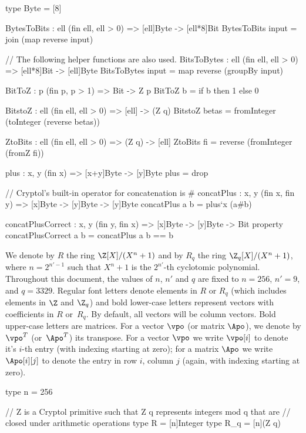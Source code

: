 \begin{code}
  type Byte = [8]
  
  BytesToBits : {ell} (fin ell, ell > 0) => [ell]Byte -> [ell*8]Bit
  BytesToBits input = join (map reverse input)

  // The following helper functions are also used.
  BitsToBytes : {ell} (fin ell, ell > 0) => [ell*8]Bit -> [ell]Byte
  BitsToBytes input = map reverse (groupBy input)

  BitToZ : {p} (fin p, p > 1) => Bit -> Z p
  BitToZ b = if b then 1 else 0
  
  BitstoZ : {ell} (fin ell, ell > 0) => [ell] -> (Z q)
  BitstoZ betas = fromInteger (toInteger (reverse betas))

  ZtoBits : {ell} (fin ell, ell > 0) => (Z q) -> [ell]
  ZtoBits fi = reverse (fromInteger (fromZ fi))

  plus : {x, y} (fin x) => [x+y]Byte -> [y]Byte
  plus = drop

  // Cryptol's built-in operator for concatenation is #
  concatPlus : {x, y} (fin x, fin y) => [x]Byte -> [y]Byte -> [y]Byte
  concatPlus a b = plus`{x} (a#b)
  
  concatPlusCorrect : {x, y} (fin y, fin x) => [x]Byte -> [y]Byte -> Bit
  property concatPlusCorrect a b = concatPlus a b == b
\end{code}
We denote by $R$ the ring $\Z[X]/(X^{n}+1)$ and by $R_q$ the ring $\Z_q[X]/(X^{n}+1)$, 
where $n=2^{n'-1}$ such that $X^{n}+1$ is the $2^{n'}$-th cyclotomic polynomial. 
Throughout this document, the values of $n$, $n'$ and $q$ are fixed to $n=256$, $n'=9$, and $q=3329$.
Regular font letters denote elements in $R$ or $R_q$ (which includes elements in $\Z$ and $\Z_q$) 
and bold lower-case letters represent vectors with coefficients in $R$ or~$R_q$.  
By default, all vectors will be column vectors. Bold upper-case letters are matrices. 
For a vector $\vpo$ (or matrix $\Apo$), we denote by $\vpo^T$ (or~$\Apo^T$) its transpose.
For a vector $\vpo$ we write $\vpo[i]$ to denote it's $i$-th entry (with indexing starting at zero);
for a matrix $\Apo$ we write $\Apo[i][j]$ to denote the entry in row $i$, column $j$ 
(again, with indexing starting at zero).

\begin{code}
  type n = 256

  // Z is a Cryptol primitive such that Z q represents integers mod q that are 
  // closed under arithmetic operations
  type R = [n]Integer
  type R_q = [n](Z q)
\end{code}


